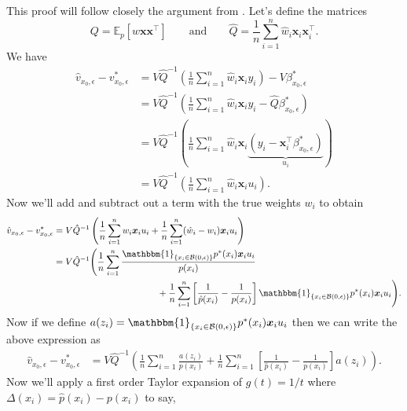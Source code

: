 \documentclass[11pt]{article}
\begin{document}
\begin{appendices}
This proof will follow closely the argument from \citet{Newey_Ruud_2005}. Let's define the matrices
\begin{equation*}
    Q = \mathbb{E}_{p}\left[w\boldsymbol{x}\boldsymbol{x}^{\top}\right] \qquad \text{and} \qquad \hat{Q} = \frac{1}{n}\sum_{i = 1}^n\hat{w}_i\boldsymbol{x}_i\boldsymbol{x}_i^{\top}.
\end{equation*}
We have
\begin{align*}
    \hat{v}_{x_0, \epsilon} - v^*_{x_0, \epsilon} &= V\hat{Q}^{-1}\left(\frac{1}{n}\sum_{i = 1}^n\hat{w}_i\boldsymbol{x}_iy_i\right) - V\beta^*_{x_0, \epsilon} \\
    &= V\hat{Q}^{-1}\left(\frac{1}{n}\sum_{i = 1}^n\hat{w}_i\boldsymbol{x}_iy_i - \hat{Q}\beta^*_{x_0, \epsilon}\right) \\
    &= V\hat{Q}^{-1}\left(\frac{1}{n}\sum_{i = 1}^n\hat{w}_i\boldsymbol{x}_i\underbrace{\left(y_i - \boldsymbol{x}_i^{\top}\beta^*_{x_0, \epsilon}\right)}_{u_i}\right) \\
    &= V\hat{Q}^{-1}\left(\frac{1}{n}\sum_{i = 1}^n\hat{w}_i\boldsymbol{x}_iu_i\right).
\end{align*}
Now we'll add and subtract out a term with the true weights $w_i$ to obtain
\begin{align*}
    \hat{v}_{x_0, \epsilon} - v^*_{x_0, \epsilon} &= V\hat{Q}^{-1}\left(\frac{1}{n}\sum_{i = 1}^nw_i\boldsymbol{x}_iu_i + \frac{1}{n}\sum_{i = 1}^n(\hat{w}_i - w_i)\boldsymbol{x}_iu_i\right) \\
    &= V\hat{Q}^{-1}\Bigg(\frac{1}{n}\sum_{i = 1}^n\frac{\mathbbm{1}_{\{x_i \in \mathcal{B}(0, \epsilon)\}}p^*(x_i)\boldsymbol{x}_iu_i}{p(x_i)} \\
    &\hspace{40mm}+ \frac{1}{n}\sum_{i = 1}^n\left[\frac{1}{\hat{p}(x_i)} - \frac{1}{p(x_i)}\right]\mathbbm{1}_{\{x_i \in \mathcal{B}(0, \epsilon)\}}p^*(x_i)\boldsymbol{x}_iu_i\Bigg).
\end{align*}
Now if we define $a(z_i) = \mathbbm{1}_{\{x_i \in \mathcal{B}(0, \epsilon)\}}p^*(x_i)\boldsymbol{x}_iu_i$ then we can write the above expression as
\begin{align*}
    \hat{v}_{x_0, \epsilon} - v^*_{x_0, \epsilon} &= V\hat{Q}^{-1}\left(\frac{1}{n}\sum_{i = 1}^n\frac{a(z_i)}{p(x_i)} + \frac{1}{n}\sum_{i = 1}^n\left[\frac{1}{\hat{p}(x_i)} - \frac{1}{p(x_i)}\right]a(z_i)\right).
\end{align*}
Now we'll apply a first order Taylor expansion of $g(t) = 1/t$ where $\Delta(x_i) = \hat{p}(x_i) - p(x_i)$ to say,
\begin{align}

\end{align}
\end{appendices}
\end{document}
